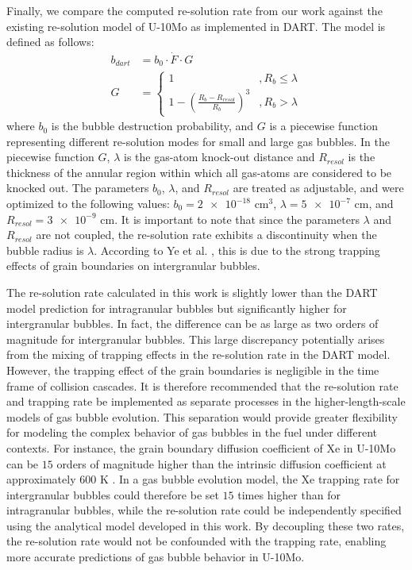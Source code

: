 \documentclass[review]{elsarticle}
\begin{document}
Finally, we compare the computed re-solution rate from our work against the existing re-solution model of U-10Mo as implemented in DART. The model is defined as follows:
\begin{align}
	b_{dart} &= b_0 \cdot \dot{F} \cdot G \\
	G &=
	\begin{cases}
		1 & ,R_b \leq \lambda \\
		1 - (\frac{R_b - R_{resol}}{R_b})^3
		  & ,R_b > \lambda
	\end{cases}
\end{align}
where $b_0$ is the bubble destruction probability, and $G$ is a piecewise function representing different re-solution modes for small and large gas bubbles. In the piecewise function $G$, $\lambda$ is the gas-atom knock-out distance and $R_{resol}$ is the thickness of the annular region within which all gas-atoms are considered to be knocked out. The parameters $b_0$, $\lambda$, and $R_{resol}$ are treated as adjustable, and were optimized to the following values: $b_0 = \num{2e-18}$ cm$^3$, $\lambda = \num{5e-7}$ cm, and $R_{resol} = \num{3e-9}$ cm. It is important to note that since the parameters $\lambda$ and $R_{resol}$ are not coupled, the re-solution rate exhibits a discontinuity when the bubble radius is $\lambda$. According to Ye et al. \cite{ye2023}, this is due to the strong trapping effects of grain boundaries on intergranular bubbles.

The re-solution rate calculated in this work is slightly lower than the DART model prediction for intragranular bubbles but significantly higher for intergranular bubbles. In fact, the difference can be as large as two orders of magnitude for intergranular bubbles. This large discrepancy potentially arises from the mixing of trapping effects in the re-solution rate in the DART model. However, the trapping effect of the grain boundaries is negligible in the time frame of collision cascades. It is therefore recommended that the re-solution rate and trapping rate be implemented as separate processes in the higher-length-scale models of gas bubble evolution. This separation would provide greater flexibility for modeling the complex behavior of gas bubbles in the fuel under different contexts. For instance, the grain boundary diffusion coefficient of Xe in U-10Mo can be $15$ orders of magnitude higher than the intrinsic diffusion coefficient at approximately 600 K \cite{hasan2024gb}. In a gas bubble evolution model, the Xe trapping rate for intergranular bubbles could therefore be set $15$ times higher than for intragranular bubbles, while the re-solution rate could be independently specified using the analytical model developed in this work. By decoupling these two rates, the re-solution rate would not be confounded with the trapping rate, enabling more accurate predictions of gas bubble behavior in U-10Mo.
\end{document}
